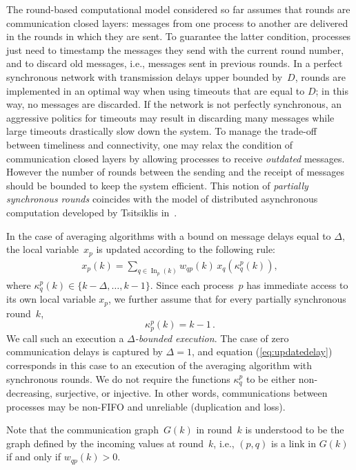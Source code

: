 \documentclass[a4paper]{article}
\theoremstyle{newthm}
\DeclareMathOperator\In{In}
\begin{document}
The round-based computational model considered so far assumes that rounds are communication 
	closed layers: messages from one process to another are delivered in the rounds in which 
	they are sent.
To guarantee the latter condition, processes just need to timestamp the messages 
	they send with  the current round number, and to discard old messages, 
	i.e., messages sent in previous rounds.
In  a perfect synchronous network with  transmission delays upper bounded by~$D$, rounds are implemented in
	an optimal way when using  timeouts that are
	equal to $D$;  in this way, no messages are discarded.
If the network is not perfectly synchronous, an aggressive politics for timeouts may result in
	discarding many messages while large timeouts drastically slow down the system.
To manage the trade-off between timeliness and connectivity, one may relax the condition
	of communication closed layers by allowing processes to receive {\em outdated} messages.
However the number of rounds between the sending and the receipt of messages 
	should be bounded  to keep the system efficient.
This notion of  {\em partially synchronous rounds} coincides with the model of distributed asynchronous computation
	developed by Tsitsiklis in~\cite{Tsi84,BT89}.

In the case of averaging algorithms with a bound on message delays equal to $\Delta$, the local variable~$x_p$ is updated according to the
	following rule:
	\begin{align}
 	x_p(k) = \sum_{q \in \In_p(k)} w_{qp}(k) \, x_q \left (  \kappa_q^p(k) \right ) ,\label{eq:updatedelay}
	\end{align}
	where $ \kappa_q^p(k) \in \{ k - \Delta, \dots, k-1\}$.
Since each process~$p$ has  immediate access to its own local variable $x_p$,  we further
	assume that for every partially synchronous round~$k$,
	$$   \kappa_p^p(k) =k - 1\, .$$
We call such an execution a {\em $\Delta$-bounded execution}.
The case of zero communication delays is captured by $\Delta = 1$, and equation (\ref{eq:updatedelay}) corresponds 
	in this case to an execution of the averaging algorithm with synchronous rounds.
We do not require the functions $\kappa_q^p$ to be either non-decreasing, surjective, or injective.
In other words, communications between processes may be non-FIFO and unreliable (duplication and loss). 

Note that the communication graph~$G(k)$ in round~$k$ is understood to be the
	graph defined by the incoming values at round~$k$, i.e., $(p,q)$ is a link in $G(k)$ 
	if and only if $w_{qp}(k)>0$.
\end{document}
